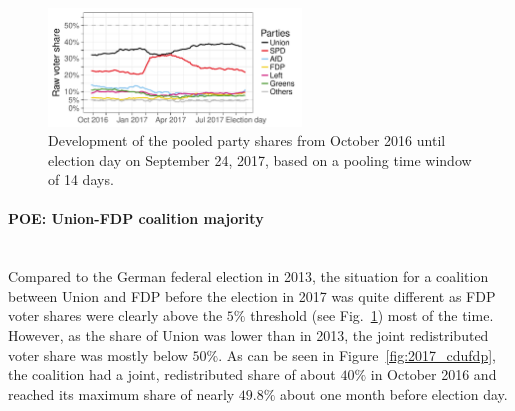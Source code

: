 \documentclass[smallcondensed]{svjour3}     %
\begin{document}
\begin{figure}[H]\centering
\includegraphics[width=0.6\textwidth]{figures/2017_pooled_rawShares.pdf}
\caption{Development of the pooled party shares from October 2016 until
election day on September 24, 2017, based on a pooling time window of 14 days.
\label{fig:2017}
}
\end{figure}


\paragraph{POE: Union-FDP coalition majority} \ \\
Compared to the German federal election in 2013, the situation for a
coalition between Union and FDP before the election in 2017
was quite different as FDP voter shares were
clearly above the $5\%$ threshold (see Fig.~\ref{fig:2017}) most of the time.
However, as the share of Union was lower than in 2013,
the joint redistributed voter share was mostly below $50\%$.
As can be seen in Figure~\ref{fig:2017_cdufdp}, the coalition had
a joint, redistributed share of about $40\%$ in October 2016
and reached its maximum share of nearly $49.8\%$ about one month
before election day.
\end{document}
